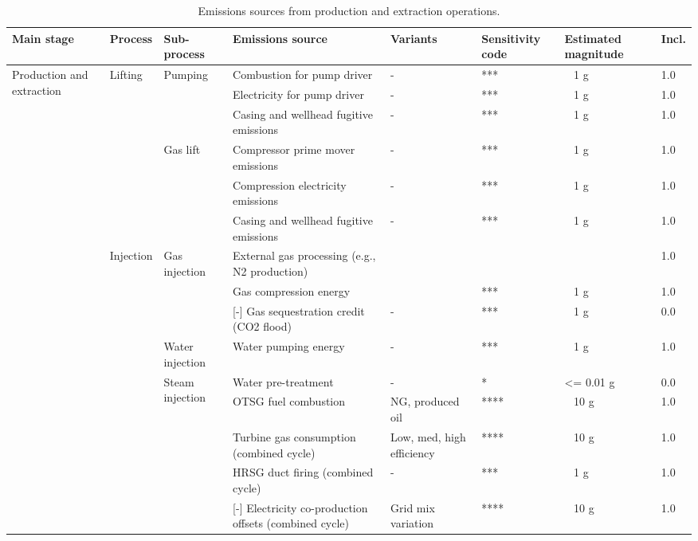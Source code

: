 \documentclass[11pt]{report}
\begin{document}
\begin{landscape}
\begin{table}
\begin{scriptsize}
\caption{Emissions sources from production and extraction operations.}
\label{tab:production_sources}
\begin{tabular}{|p{}|p{}|p{}|p{}|p{}|p{}|p{}|p{}|}
\hline
\textbf{Main stage} & \textbf{Process} & \textbf{Sub-process} & \textbf{Emissions source} & \textbf{Variants}& \textbf{Sensitivity code} & \textbf{Estimated magnitude} & \textbf{Incl.}\\
\hline
\multirow{22}{0.08\columnwidth}{Production and extraction} & \multirow{6}{*}{Lifting} & \multirow{3}{*}{Pumping} & Combustion for pump driver & - & *** & ~ 1 g & 1.0\\
\cline{4-8}
& & & Electricity for pump driver & - & *** & ~ 1 g & 1.0\\
\cline{4-8}
& & & Casing and wellhead fugitive emissions & - & *** & ~ 1 g & 1.0\\
\cline{3-8}
& & \multirow{3}{*}{Gas lift} & Compressor prime mover emissions & - & *** & ~ 1 g & 1.0\\
\cline{4-8}
& & & Compression electricity emissions & - & *** & ~ 1 g & 1.0\\
\cline{4-8}
& & & Casing and wellhead fugitive emissions & - & *** & ~ 1 g & 1.0\\
\cline{2-8}
& \multirow{16}{*}{Injection} & \multirow{3}{*}{Gas injection} & External gas processing (e.g., N2 production) & & & & 1.0\\
\cline{4-8}
& & & Gas compression energy & & *** & ~ 1 g & 1.0\\
\cline{4-8}
& & & [-] Gas sequestration credit (CO2 flood) & - & *** & ~ 1 g & 0.0\\
\cline{3-8}
& & Water injection & Water pumping energy & - & *** & ~ 1 g & 1.0\\
\cline{3-8}
& & \multirow{6}{*}{Steam injection} & Water pre-treatment & - & * & <= 0.01 g & 0.0\\
\cline{4-8}
& & & OTSG fuel combustion & NG, produced oil & **** & ~ 10 g & 1.0\\
\cline{4-8}
& & & Turbine gas consumption (combined cycle) & Low, med, high efficiency & **** & ~ 10 g & 1.0\\
\cline{4-8}
& & & HRSG duct firing (combined cycle) & - & *** & ~ 1 g & 1.0\\
\cline{4-8}
& & & [-] Electricity co-production offsets (combined cycle) & Grid mix variation & **** & ~ 10 g & 1.0\\

\end{tabular}
\end{scriptsize}
\end{table}
\end{landscape}
\end{document}
